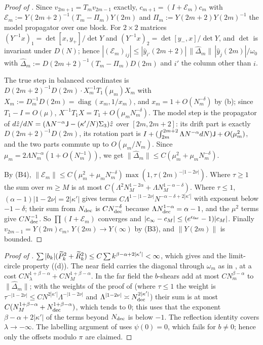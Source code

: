 \begin{proof}[Proof of ]
Since $v_{2m+1}=T_mv_{2m-1}$ exactly, $c_{m+1}=(I+\mathcal E_m)c_m$ with
$\mathcal E_m:=Y(2m+2)^{-1}(T_m-\Pi_m)Y(2m)$ and $\Pi_m:=Y(2m+2)Y(2m)^{-1}$ the model
propagator over one block. For $2\times2$ matrices $(Y^{-1}x)_1=\det[x,y_+]/\det Y$ and
$(Y^{-1}x)_2=\det[y_-,x]/\det Y$, and $\det$ is invariant under $D(N)$; hence
$|(\mathcal E_m)_{ij}|\le|\hat y_{i'}(2m+2)|\,\|\hat\Delta_m\|\,|\hat y_j(2m)|/\omega_0$ with
$\hat\Delta_m:=D(2m+2)^{-1}(T_m-\Pi_m)D(2m)$ and $i'$ the column other than $i$.

The true step in balanced coordinates is $D(2m+2)^{-1}D(2m)\cdot X_m^{-1}T_1(\mu_m)X_m$ with
$X_m:=D_m^{-1}D(2m)=\operatorname{diag}(x_m,1/x_m)$, and $x_m=1+O(N_m^{-\delta})$ by
(b); since $T_1-I=O(\mu)$, $X^{-1}T_1X=T_1+O(\mu_mN_m^{-\delta})$. The model
step is the propagator of $d\hat z/dN=(\Lambda N^{-\alpha}\mathsf{J}-(\kappa'/N)\Sigma_3)\hat z$ over
$[2m,2m+2]$: its drift part is exactly $D(2m+2)^{-1}D(2m)$, its rotation part is
$I+(\int_{2m}^{2m+2}\Lambda N^{-\alpha}dN)\mathsf{J}+O(\mu_m^2)$, and the two parts commute up to
$O(\mu_m/N_m)$. Since $\mu_m=2\Lambda N_m^{-\alpha}(1+O(N_m^{-1}))$, we get
$\|\hat\Delta_m\|\le C(\mu_m^2+\mu_mN_m^{-\delta})$.

By (B4), $\|\mathcal E_m\|\le C(\mu_m^2+\mu_mN_m^{-\delta})\max(1,\tau(2m)^{-|1-2\nu|})$. Where
$\tau\ge1$ the sum over $m\ge M$ is at most $C(\Lambda^2N_M^{1-2\alpha}+\Lambda N_M^{1-\alpha-\delta})$.
Where $\tau\le1$, $(\alpha-1)|1-2\nu|=2|\kappa'|$ gives terms
$C\Lambda^{1-|1-2\nu|}N^{-\alpha-\delta+2|\kappa'|}$ with exponent below $-1-\delta$; their sum
from $N_{\rm dec}$ is $CN_{\rm dec}^{-\delta}$ because $\Lambda N_{\rm dec}^{1-\alpha}=\alpha-1$, and the
$\mu^2$ terms give $CN_{\rm dec}^{-1}$. So $\prod(I+\mathcal E_m)$ converges and
$|c_\infty-c_M|\le(e^{\epsilon_{\rm far}}-1)|c_M|$. Finally $v_{2m-1}=Y(2m)c_m$, $Y(2m)\to Y(\infty)$
by (B3), and $\|Y(2m)\|$ is bounded.
\end{proof}

\begin{proof}[Proof of ]
$\sum|b_k|(\widetilde P_k^2+\widetilde R_k^2)\le C\sum k^{\beta-\alpha+2|\kappa'|}<\infty$, which gives
 and the limit-circle property ((d)). The near field
carries the diagonal through $\omega_m$ as in , at a cost
$CN_\lambda^{1+\beta-\alpha}+CN_M^{1+\beta-\alpha}$. In the far field the $b$-shears add at most
$CN_m^{\beta-\alpha}$ to $\|\hat\Delta_m\|$; with the weights of the proof of
 (where $\tau\le1$ the weight is $\tau^{-|1-2\nu|}\le CN^{2|\kappa'|}\Lambda^{-|1-2\nu|}$ and
$\Lambda^{|1-2\nu|}\asymp N_{\rm dec}^{2|\kappa'|}$) their sum is at most $C(N_M^{1+\beta-\alpha}+N_{\rm dec}^{1+\beta-\alpha})$,
which tends to $0$; this uses that the exponent $\beta-\alpha+2|\kappa'|$ of the terms beyond
$N_{\rm dec}$ is below $-1$. The reflection identity covers $\lambda\to-\infty$. The labelling
argument of  uses $\psi(0)=0$, which fails for $b\neq0$; hence only the
offsets modulo $\pi$ are claimed.
\end{proof}

